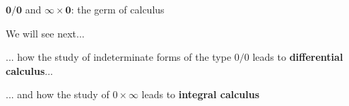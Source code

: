 \documentclass[9pt]{beamer}
\begin{document}


    
        
        


    

\begin{frame}{$\pmb{0/0}$ and $\pmb{\infty\times 0}$: the germ of calculus}

    We will see next...
    \vspace{0.3cm}
    
    ... how the study of indeterminate forms of the type $0/0$ leads to \textbf{differential calculus}...
    \vspace{0.3cm}
    
    ... and how the study of $0\times\infty$ leads to \textbf{integral calculus}
    
\end{frame}
\end{document}
